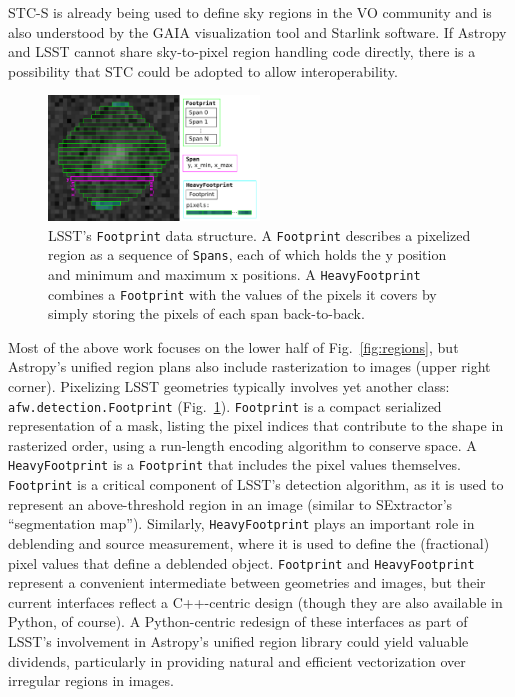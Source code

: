\documentclass[]{spie}  %
\begin{document}
STC-S is already being used to define sky regions in the VO community and is also understood by the GAIA visualization tool\cite{2009ASPC..411..575D} and Starlink software\cite{2010ASPC..434..213B,2014ASPC..485..391C}.
If Astropy and LSST cannot share sky-to-pixel region handling code directly, there is a possibility that STC could be adopted to allow interoperability.

\begin{figure} [t]
\begin{center}
\includegraphics[width=0.5\textwidth]{footprint}
\end{center}
\caption[footprint]
{\label{fig:footprint}
LSST's \texttt{Footprint} data structure.
A \texttt{Footprint} describes a pixelized region as a sequence of \texttt{Spans}, each of which holds the y position and minimum and maximum x positions.
A \texttt{HeavyFootprint} combines a \texttt{Footprint} with the values of the pixels it covers by simply storing the pixels of each span back-to-back.}
\end{figure}

Most of the above work focuses on the lower half of Fig.~\ref{fig:regions}, but Astropy's unified region plans also include rasterization to images (upper right corner).
Pixelizing LSST geometries typically involves yet another class: \texttt{afw.detection.Footprint} (Fig.~\ref{fig:footprint}).
\texttt{Footprint} is a compact serialized representation of a mask, listing the pixel indices that contribute to the shape in rasterized order, using a run-length encoding algorithm to conserve space.
A \texttt{HeavyFootprint} is a \texttt{Footprint} that includes the pixel values themselves.
\texttt{Footprint} is a critical component of LSST's detection algorithm, as it is used to represent an above-threshold region in an image (similar to SExtractor's ``segmentation map'').
Similarly, \texttt{HeavyFootprint} plays an important role in deblending and source measurement, where it is used to define the (fractional) pixel values that define a deblended object.
\texttt{Footprint} and \texttt{HeavyFootprint} represent a convenient intermediate between geometries and images, but their current interfaces reflect a C++-centric design (though they are also available in Python, of course).
A Python-centric redesign of these interfaces as part of LSST's involvement in Astropy's unified region library could yield valuable dividends, particularly in providing natural and efficient vectorization over irregular regions in images.
\end{document}
